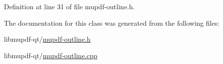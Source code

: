 Definition at line 31 of file mupdf-\/outline.\-h.



The documentation for this class was generated from the following files\-:\begin{DoxyCompactItemize}
\item 
libmupdf-\/qt/\hyperlink{mupdf-outline_8h}{mupdf-\/outline.\-h}\item 
libmupdf-\/qt/\hyperlink{mupdf-outline_8cpp}{mupdf-\/outline.\-cpp}\end{DoxyCompactItemize}
